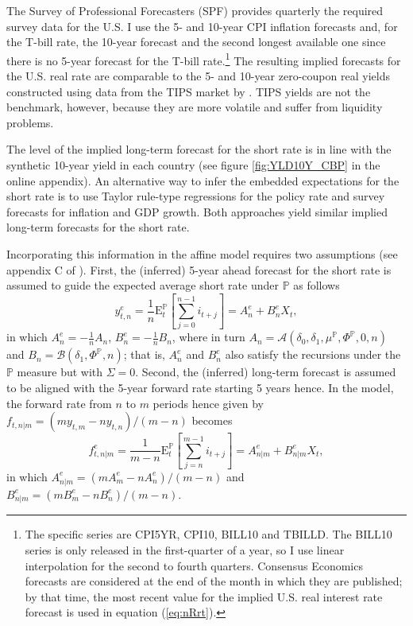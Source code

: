\documentclass[a4paper, 12pt]{article}
\providecommand{\tnr}{n}
\providecommand{\tnrfwd}{m}
\providecommand{\idxt}{t}
\providecommand{\idxs}{\idxt,\tnr}
\providecommand{\idxsfwd}{\tnr | \tnrfwd}
\providecommand{\idxsfwdt}{\idxt,\idxsfwd}
\providecommand{\yld}{y}
\providecommand{\xpc}{e}
\providecommand{\yZero}{\yld_{\idxs}}
\providecommand{\yZeroE}{\yZero^{\xpc}}
\providecommand{\yZeroFwd}{\frate_{\idxsfwdt}}
\providecommand{\yZeroEfwd}{\yZeroFwd^{\xpc}}
\providecommand{\srate}{i}
\providecommand{\frate}{f}
\providecommand{\Xvars}{X_{\idxt}}
\providecommand{\affineA}{A_{\tnr}}
\providecommand{\affineB}{B_{\tnr}}
\providecommand{\affineAe}{\affineA^{\xpc}}
\providecommand{\affineBe}{\affineB^{\xpc}}
\providecommand{\affineAeFwd}{A_{\idxsfwd}^{\xpc}}
\providecommand{\affineBeFwd}{B_{\idxsfwd}^{\xpc}}
\providecommand{\Pmeasure}{\mathbb{P}}
\providecommand{\ExpP}{\mathrm{E}^{\Pmeasure}_{t}}
\providecommand{\deltazero}{\delta_{0}}
\providecommand{\deltaone}{\delta_{1}}
\providecommand{\XmuP}{\mu^{\Pmeasure}}
\providecommand{\XSigma}{\Sigma}
\providecommand{\XPhiP}{\Phi^{\Pmeasure}}
\newcommand{\eqyFwd}{\yZeroFwd = \left( \tnrfwd \yld_{\idxt,\tnrfwd} - \tnr \yZero \right)/ \left( \tnrfwd - \tnr \right) }
\newcommand{\eqAeFwd}{\affineAeFwd = \left( \tnrfwd A_{\tnrfwd}^{\xpc}  - \tnr \affineAe \right)/ \left( \tnrfwd - \tnr \right) }
\newcommand{\eqBeFwd}{\affineBeFwd = \left( \tnrfwd B_{\tnrfwd}^{\xpc}  - \tnr \affineBe \right)/ \left( \tnrfwd - \tnr \right) }
\begin{document}
The Survey of Professional Forecasters (SPF) provides quarterly the required survey data for the U.S. I use the 5- and 10-year CPI inflation forecasts and, for the T-bill rate, the 10-year forecast and the second longest available one since there is no 5-year forecast for the T-bill rate.\footnote{ The specific series are CPI5YR, CPI10, BILL10 and TBILLD. The BILL10 series is only released in the first-quarter of a year, so I use linear interpolation for the second to fourth quarters. Consensus Economics forecasts are considered at the end of the month in which they are published; by that time, the most recent value for the implied U.S. real interest rate forecast is used in equation (\ref{eq:nRrt}).} The resulting implied forecasts for the U.S. real rate are comparable to the 5- and 10-year zero-coupon real yields constructed using data from the TIPS market by \cite{GSW:2010}. TIPS yields are not the benchmark, however, because they are more volatile and suffer from liquidity problems. 

The level of the implied long-term forecast for the short rate is in line with the synthetic 10-year yield in each country (see figure \ref{fig:YLD10Y_CBP} in the online appendix). An alternative way to infer the embedded expectations for the short rate is to use Taylor rule-type regressions for the policy rate and survey forecasts for inflation and GDP growth. Both approaches yield similar implied long-term forecasts for the short rate. 

Incorporating this information in the affine model requires two assumptions (see appendix C of \cite{Guimaraes:2014}). First, the (inferred) 5-year ahead forecast for the short rate is assumed to guide the expected average short rate under \(\Pmeasure\) as follows 
\begin{equation*}
\yZeroE = \frac{1}{\tnr} \ExpP \left[ \sum_{j=0} ^{\tnr-1} \srate_{\idxt+j} \right] = \affineAe + \affineBe \Xvars,
\end{equation*}
\noindent in which \(\affineAe = - \frac{1}{\tnr} \affineA\), \(\affineBe = - \frac{1}{\tnr} \affineB\), where in turn \(\affineA = \mathcal{A}(\deltazero, \deltaone, \XmuP, \XPhiP, 0, \tnr)\) and \(\affineB = \mathcal{B}(\deltaone, \XPhiP, \tnr)\); that is, \(\affineAe\) and \(\affineBe\) also satisfy the recursions under the \(\Pmeasure\) measure but with \(\XSigma = 0\). Second, the (inferred) long-term forecast is assumed to be aligned with the 5-year forward rate starting 5 years hence. In the model, the forward rate from \(\tnr\) to \(\tnrfwd\) periods hence given by \(\eqyFwd\) becomes 
\begin{equation*}
\yZeroEfwd = \frac{1}{\tnrfwd - \tnr} \ExpP \left[ \sum_{j = \tnr} ^{\tnrfwd-1} \srate_{\idxt+j} \right] = \affineAeFwd + \affineBeFwd \Xvars ,
\end{equation*}
\noindent in which \(\eqAeFwd\)  and \(\eqBeFwd\). 
\end{document}
